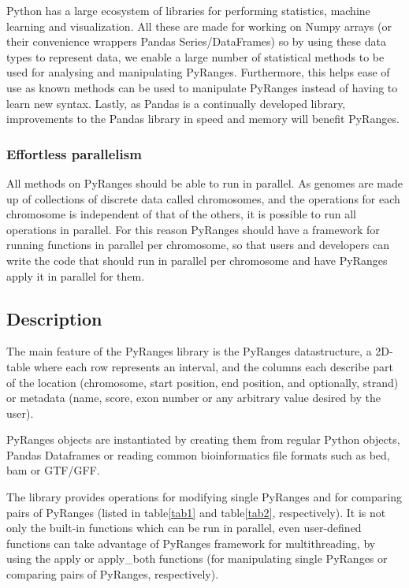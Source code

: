 \documentclass[10pt,letterpaper]{article}
\begin{document}
Python has a large ecosystem of libraries for performing statistics, machine
learning and visualization. All these are made for working on Numpy arrays (or
their convenience wrappers Pandas Series/DataFrames) so by using these data
types to represent data, we enable a large number of statistical methods to be
used for analysing and manipulating PyRanges. Furthermore, this helps ease of
use as known methods can be used to manipulate PyRanges instead of having to
learn new syntax. Lastly, as Pandas is a continually developed library,
improvements to the Pandas library in speed and memory will benefit PyRanges.

\subsubsection*{Effortless parallelism}

All methods on PyRanges should be able to run in parallel. As genomes are made
up of collections of discrete data called chromosomes, and the operations for
each chromosome is independent of that of the others, it is possible to run all
operations in parallel. For this reason PyRanges should have a framework for
running functions in parallel per chromosome, so that users and developers can
write the code that should run in parallel per chromosome and have PyRanges
apply it in parallel for them.

\subsection*{Description}

The main feature of the PyRanges library is the PyRanges datastructure, a
2D-table where each row represents an interval, and the columns each describe
part of the location (chromosome, start position, end position, and optionally,
strand) or metadata (name, score, exon number or any arbitrary value desired by
the user).

PyRanges objects are instantiated by creating them from regular Python objects,
Pandas Dataframes or reading common bioinformatics file formats such as bed, bam
or GTF/GFF.

The library provides operations for modifying single PyRanges and for comparing
pairs of PyRanges (listed in table\ref{tab1} and table\ref{tab2}, respectively).
It is not only the built-in functions which can be run in parallel, even
user-defined functions can take advantage of PyRanges framework for
multithreading, by using the apply or apply\_both functions (for manipulating
single PyRanges or comparing pairs of PyRanges, respectively).
\end{document}
